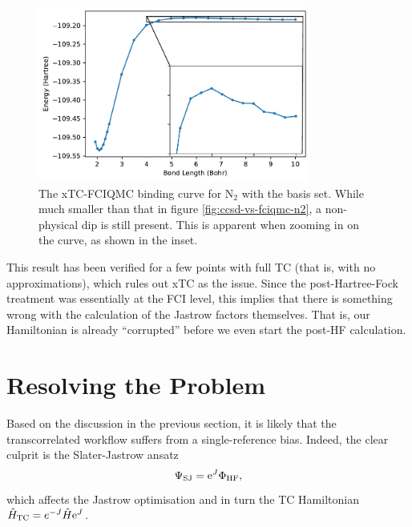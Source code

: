 \begin{figure}[htbp]
    \centering
    \includegraphics[width=0.8\textwidth]{figures/binding/inset_nontcfciqmc}
    \caption{The xTC-FCIQMC binding curve for N$_2$ with the \avtz basis set. While much smaller than that in figure \ref{fig:ccsd-vs-fciqmc-n2}, a non-physical dip is still present. This is apparent when zooming in on the curve, as shown in the inset.}
    \label{fig:binding-dip}
\end{figure}

This result has been verified for a few points with full TC (that is, with no approximations), which rules out xTC as the issue. Since the post-Hartree-Fock treatment was essentially at the FCI level, this implies that there is something wrong with the calculation of the Jastrow factors themselves. That is, our Hamiltonian is already ``corrupted'' before we even start the post-HF calculation.


\section{Resolving the Problem}

Based on the discussion in the previous section, it is likely that the transcorrelated workflow suffers from a single-reference bias. Indeed, the clear culprit is the Slater-Jastrow ansatz
\begin{equation}
    \label{eq:slater-jastrow-unichap}
    \Psi_\mathrm{SJ} = \mathrm{e}^J\Phi_\mathrm{HF},
\end{equation}
which affects the Jastrow optimisation and in turn the TC Hamiltonian $\hat H_\mathrm{TC} = e^{-J}\hat H\mathrm{e}^J$.


